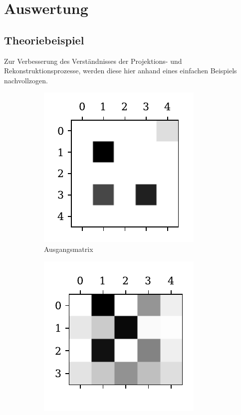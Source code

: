 \documentclass[slug=PET, room=Andreas-Schubert-Bau\,\ 424A, supervisor=Carsten\ Bittrich, coursedate=10.\ 01.\ 2020]{../../Lab_Report_LaTeX/lab_report}
\begin{document}
\section{Auswertung}
\label{sec:ausw}

\subsection{Theoriebeispiel}
\label{sec:theobei}
Zur Verbesserung des Verst\"andnisses der Projektions- und
Rekonstruktionsprozesse, werden diese hier anhand eines einfachen
Beispiels nachvollzogen.

\begin{figure}[htp]
  \centering
  \begin{subfigure}[t]{.25\textwidth}
    \centering
    \includegraphics[width=.6\textwidth]{../auswertung/figs/theory/source.pdf}
    \caption{Ausgangsmatrix}
    \label{fig:theory-source}
  \end{subfigure}
  \begin{subfigure}[t]{.25\textwidth}
    \centering
    \includegraphics[width=.6\textwidth]{../auswertung/figs/theory/projection.pdf}

\end{subfigure}
\end{figure}
\end{document}
